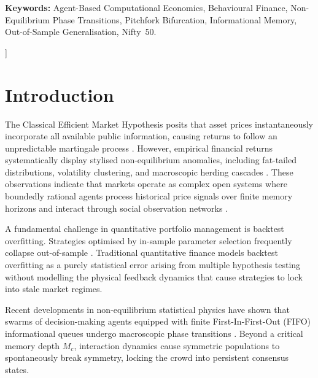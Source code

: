 \documentclass[10pt,twocolumn,twoside,a4paper]{article}
\begin{document}
\begin{@twocolumnfalse}
\begin{abstract}
    Finally, in the \textbf{PIMS Unification}, we prove that backtest overfitting ($\Delta\text{Sharpe}$)
    is the direct manifestation of the crowd pitchfork phase transition. Applying the physical
    sub-critical stability constraint ($M_{\text{eff}}\le M_c$) increases mean out-of-sample Sharpe
    ratios by $+41.4\%$ (0.564 versus 0.399) while reducing the overfitting gap by 37.7\%
    (0.375 versus 0.602).
    \end{abstract}
    \vspace{0.3cm}
    \noindent \textbf{Keywords:} Agent-Based Computational Economics, Behavioural Finance,
    Non-Equilibrium Phase Transitions, Pitchfork Bifurcation, Informational Memory,
    Out-of-Sample Generalisation, Nifty~50.
    \vspace{0.6cm}
  \end{@twocolumnfalse}
]

\section{Introduction}

The Classical Efficient Market Hypothesis posits that asset prices instantaneously incorporate all
available public information, causing returns to follow an unpredictable martingale process
\cite{fama1970efficient}. However, empirical financial returns systematically display stylised
non-equilibrium anomalies, including fat-tailed distributions, volatility clustering, and macroscopic
herding cascades \cite{lux1999scaling, cont2001empirical, shiller2000irrational}. These observations
indicate that markets operate as complex open systems where boundedly rational agents process
historical price signals over finite memory horizons and interact through social observation networks
\cite{bouchaud2013more, farmer2009economy, kirman1993ants}.

A fundamental challenge in quantitative portfolio management is backtest overfitting. Strategies
optimised by in-sample parameter selection frequently collapse out-of-sample \cite{bailey2017probability}.
Traditional quantitative finance models backtest overfitting as a purely statistical error arising from
multiple hypothesis testing without modelling the physical feedback dynamics that cause strategies to
lock into stale market regimes.

Recent developments in non-equilibrium statistical physics have shown that swarms of decision-making
agents equipped with finite First-In-First-Out (FIFO) informational queues undergo macroscopic phase
transitions \cite{li2026informational}. Beyond a critical memory depth $M_c$, interaction dynamics
cause symmetric populations to spontaneously break symmetry, locking the crowd into persistent
consensus states.
\end{document}
